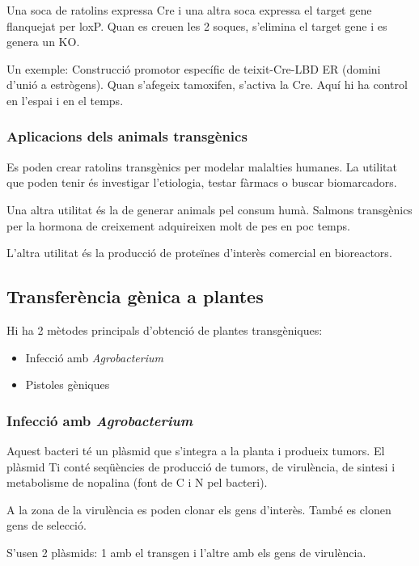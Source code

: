 
Una soca de ratolins expressa Cre i una altra soca expressa el target
gene flanquejat per loxP. Quan es creuen les 2 soques, s'elimina el
target gene i es genera un KO.

Un exemple: Construcció promotor específic de teixit-Cre-LBD ER
(domini d'unió a estrògens). Quan s'afegeix tamoxifen, s'activa la
Cre. Aquí hi ha control en l'espai i en el temps.

\subsubsection{Aplicacions dels animals transgènics}
\label{sec:aplic-dels-anim}

Es poden crear ratolins transgènics per modelar malalties humanes. La
utilitat que poden tenir és investigar l'etiologia, testar fàrmacs o
buscar biomarcadors.

Una altra utilitat és la de generar animals pel consum humà. Salmons
transgènics per la hormona de creixement adquireixen molt de pes en
poc temps.

L'altra utilitat és la producció de proteïnes d'interès comercial en
bioreactors.

\subsection{Transferència gènica a plantes}
\label{sec:transf-genica-plant}

Hi ha 2 mètodes principals d'obtenció de plantes transgèniques:
\begin{itemize}
\item Infecció amb \textit{Agrobacterium}
\item Pistoles gèniques
\end{itemize}

\subsubsection{Infecció amb \textit{Agrobacterium}}
\label{sec:infecc-amb-text}

Aquest bacteri té un plàsmid que s'integra a la planta i produeix
tumors. El plàsmid Ti conté seqüències de producció de tumors, de
virulència, de sintesi i metabolisme de nopalina (font de C i N pel
bacteri).

A la zona de la virulència es poden clonar els gens d'interès. També
es clonen gens de selecció.

S'usen 2 plàsmids: 1 amb el transgen i l'altre amb els gens de
virulència.

